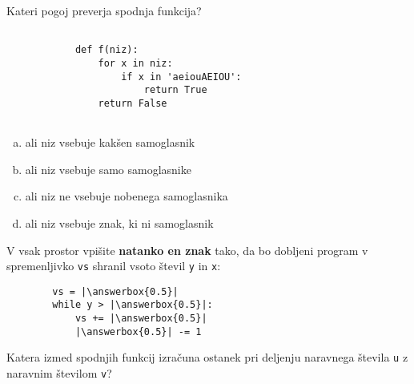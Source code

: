 \documentclass[arhiv, 10pt]{../izpit}
\newcommand{\inlinepy}[1]{\texttt{#1}}
\newcommand{\answerbox}[1]{\framebox{\vphantom{\large M}\hspace{#1cm}}}
\begin{document}
        \naloga*

        \begin{multicols}{2}
        \noindent
        Kateri pogoj preverja spodnja funkcija?
        \begin{verbatim}
        
            def f(niz):
                for x in niz:
                    if x in 'aeiouAEIOU':
                        return True
                return False
            
        \end{verbatim}

        \begin{enumerate}[(a)]
\item ali niz vsebuje kakšen samoglasnik
\item ali niz vsebuje samo samoglasnike
\item ali niz ne vsebuje nobenega samoglasnika
\item ali niz vsebuje znak, ki ni samoglasnik
\end{enumerate}

        \end{multicols}
    
        \naloga*
        \begin{multicols}{2}
        \noindent
        V vsak prostor vpišite \textbf{natanko en znak} tako, da bo dobljeni program v spremenljivko \inlinepy{vs} shranil vsoto števil \inlinepy{y} in \inlinepy{x}:
        
        \columnbreak
        \begin{verbatim}
        vs = |\answerbox{0.5}|
        while y > |\answerbox{0.5}|:
            vs += |\answerbox{0.5}|
            |\answerbox{0.5}| -= 1
        \end{verbatim}
        \end{multicols}
    
        \clearpage
        \naloga
        
        Katera izmed spodnjih funkcij izračuna ostanek pri deljenju naravnega števila \inlinepy{u} z naravnim številom \inlinepy{v}?
    
\end{document}
